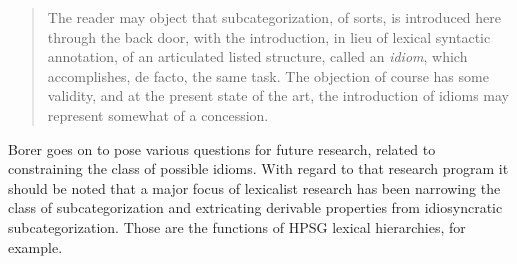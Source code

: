 \begin{exe}
\begin{xlist}[iv.]
\begin{exe}
\begin{xlist}[iv.]
\begin{quote}
The reader may object that subcategorization, of sorts, is introduced here through the back door, with the introduction, in lieu of lexical syntactic annotation, of an articulated listed structure, called an \emph{idiom}, which accomplishes, de facto, the same task.  The objection of course has some validity, and at the present state of the art, the introduction of idioms may represent somewhat of a concession. 
  \\ \citep[Vol. II, p.\,354--355]{Borer2005a-u}
\end{quote}
Borer goes on to pose various questions for future research, related to constraining the class of
possible idioms.   With regard to that research program it should be noted that a major focus of lexicalist research has been narrowing the class of subcategorization and extricating derivable properties from idiosyncratic subcategorization.  Those
are the functions of HPSG lexical hierarchies, for example.  
%






\end{xlist}
\end{exe}
\end{xlist}
\end{exe}
